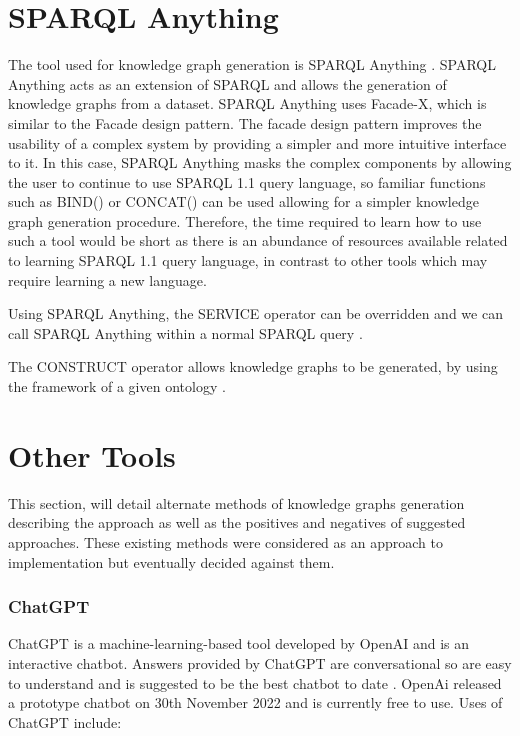 \section{SPARQL Anything}
\hspace{0.5cm} The tool used for knowledge graph generation is SPARQL Anything \cite{sparqlanythinggithub}. SPARQL Anything acts as an extension of SPARQL  and allows the generation of knowledge graphs from a dataset. SPARQL Anything uses Facade-X, which is similar to the Facade design pattern. The facade design pattern improves the usability of a complex system by providing a simpler and more intuitive interface to it. In this case, SPARQL Anything masks the complex components by allowing the user to continue to use SPARQL 1.1 query language, so familiar functions such as BIND() or CONCAT() can be used allowing for a simpler knowledge graph generation procedure. Therefore, the time required to learn how to use such a tool would be short as there is an abundance of resources available related to learning SPARQL 1.1 query language, in contrast to other tools which may require learning a new language. 

Using SPARQL Anything, the SERVICE operator can be overridden and we can call SPARQL Anything within a normal SPARQL query \cite{sparqlanything}.

The CONSTRUCT operator allows knowledge graphs to be generated, by using the framework of a given ontology \cite{sparqlanythinggithub}.

\section{Other Tools}

\hspace{0.5cm} This section, will detail alternate methods of knowledge graphs generation describing the approach as well as the positives and negatives of suggested approaches. These existing methods were considered as an approach to implementation but eventually decided against them. 

\subsubsection{ChatGPT}
\hspace{0.5cm}  ChatGPT is a machine-learning-based tool developed by OpenAI and is an interactive chatbot. Answers provided by ChatGPT are conversational so are easy to understand and is suggested to be the best chatbot to date \cite{chatgpt}. OpenAi released a prototype chatbot on 30th November 2022 and is currently free to use. Uses of ChatGPT include:

